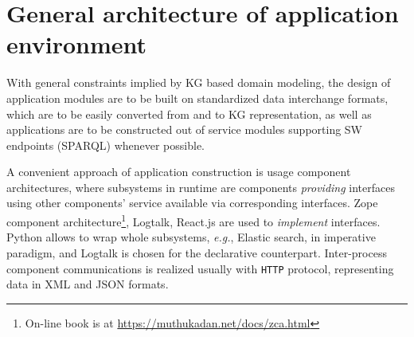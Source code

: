 \documentclass[
]{ceurart}
\begin{document}

\section{General architecture of application environment}
\label{sec:architecture}

With general constraints implied by KG based domain modeling, the design of application modules are to be built on standardized data interchange formats, which are to be easily converted from and to KG representation, as well as applications are to be constructed out of service modules supporting SW endpoints (SPARQL) whenever possible.

A convenient approach of application construction is usage component architectures, where subsystems in runtime are components \emph{providing} interfaces using other components' service available via corresponding interfaces.  Zope component architecture\footnote{On-line book is at \url{https://muthukadan.net/docs/zca.html}}, Logtalk, React.js are used to \emph{implement} interfaces.  Python allows to wrap whole subsystems, \emph{e.g.}, Elastic search, in imperative paradigm, and Logtalk is chosen for the declarative counterpart.  Inter-process component communications is realized usually with \texttt{HTTP} protocol, representing data in XML and JSON formats.
\end{document}
